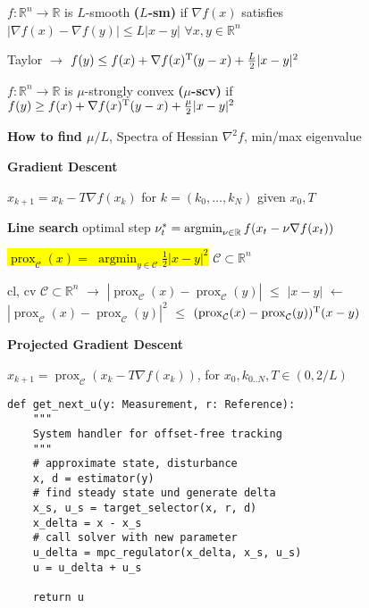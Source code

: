 \begin{definition}[smoothness]
	$f : \mathbb{R}^{n}\rightarrow \mathbb{R}$
	is $L$-smooth \textbf{($L$-sm)} if
	$\nabla f(x)$
	satisfies
	$|\nabla f(x)-\nabla f(y)|\le L|x-y|$
	$\forall x,y \in \mathbb{R}^{n}$
\end{definition}

Taylor
$\rightarrow$
$f(y)\le f(x)+\nabla f(x)^\textnormal{\scriptsize T} (y-x) +\frac{L}{2}|x-y|^2$

\begin{definition}
	$f : \mathbb{R}^{n}\rightarrow \mathbb{R}$
	is $\mu$-strongly convex \textbf{($\mu$-scv)} if
	$f(y)\ge f(x)+\nabla f(x)^\textnormal{\scriptsize T}(y-x)+\frac{\mu}{2}|x-y|^2$
\end{definition}

\textbf{How to find $\mu/L$},
Spectra of Hessian $\nabla^2f$, min/max eigenvalue

\textbf{Gradient Descent}

$x_{k+1}=x_k-T\nabla f(x_k)$
for
$k = (k_0,\dots,k_N)$
given
$x_0,T$


\textbf{Line search}
optimal step
$\nu_t^*=\operatorname{argmin}_{\nu\in\mathbb{R}}f(x_t-\nu\nabla f(x_t))$


\begin{definition}[]
	\textcolor{hltext}{\hl{ $\operatorname{prox}_\mathcal{C}(x)=$
	$\operatorname{argmin}_{y\in\mathcal{C}}\frac{1}{2}|x-y|^2$ }}
	$\mathcal{C}\subset \mathbb{R}^{n}$
\end{definition}

\begin{lemma}
	cl, cv
	$\mathcal{C}\subset \mathbb{R}^{n}$
	$\rightarrow$
	$|\operatorname{prox}_\mathcal{C}(x)-\operatorname{prox}_\mathcal{C}(y)|$
	$\le$
	$|x-y|$
	$\leftarrow$
	$|\operatorname{prox}_\mathcal{C}(x)-\operatorname{prox}_\mathcal{C}(y)|^2$
	$\le$
	$(\operatorname{prox}_\mathcal{C}(x)-\operatorname{prox}_\mathcal{C}(y))^\textnormal{\scriptsize T}(x-y)$
\end{lemma}


\textbf{Projected Gradient Descent}

$x_{k+1}=\operatorname{prox}_\mathcal{C}(x_k-T\nabla f(x_k))$,
for $x_0,k_{0..N},T\in(0,2/L)$

\begin{adjustbox}{rndcorners=0.5mm}
	\begin{lstlisting}[style=sst]
def get_next_u(y: Measurement, r: Reference):
    """
    System handler for offset-free tracking
    """
    # approximate state, disturbance
    x, d = estimator(y)
    # find steady state und generate delta
    x_s, u_s = target_selector(x, r, d)
    x_delta = x - x_s
    # call solver with new parameter
    u_delta = mpc_regulator(x_delta, x_s, u_s)
    u = u_delta + u_s

    return u
\end{lstlisting}
\end{adjustbox}
